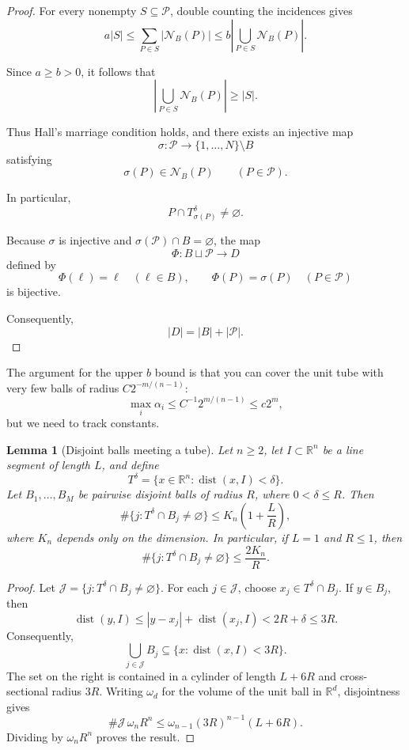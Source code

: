\documentclass[11pt, letterpaper]{nyjm}
\newtheorem{lemma}[theorem]{Lemma}
\begin{document}
	\begin{proof}
		For every nonempty $S\subseteq\mathcal P$,
		double counting the incidences gives
		\[
		a|S|
		\le \sum_{P\in S}|\mathcal N_B(P)|
		\le b\left|
		\bigcup_{P\in S}\mathcal N_B(P)
		\right|.
		\]
		
		Since $a\ge b>0$, it follows that
		\[
		\left|
		\bigcup_{P\in S}\mathcal N_B(P)
		\right|
		\ge |S|.
		\]
		
		Thus Hall's marriage condition holds, and
		there exists an injective map
		\[
		\sigma:\mathcal P
		\longrightarrow\{1,\ldots,N\}\setminus B
		\]
		satisfying
		\[
		\sigma(P)\in\mathcal N_B(P)
		\qquad(P\in\mathcal P).
		\]
		
		In particular,
		\[
		P\cap T_{\sigma(P)}^\delta\ne\varnothing.
		\]
		
		Because $\sigma$ is injective and
		$\sigma(\mathcal P)\cap B=\varnothing$,
		the map
		\[
		\Phi:B\sqcup\mathcal P\longrightarrow D
		\]
		defined by
		\[
		\Phi(\ell)=\ell\quad(\ell\in B),
		\qquad
		\Phi(P)=\sigma(P)\quad(P\in\mathcal P)
		\]
		is bijective.
		
		Consequently,
		\[
		|D|=|B|+|\mathcal P|.
		\]
	\end{proof}
	
	
	The argument for the upper $b$ bound is that you can cover the unit tube with very few balls of radius $C2^{-m/(n-1)}$: 
	\[
	\max_i \alpha_i \leq C^{-1}2^{m/(n-1)} \leq c2^{m},
	\]
	but we need to track constants.
	\begin{lemma}[Disjoint balls meeting a tube]
		Let $n\ge2$, let $I\subset\mathbb{R}^n$ be a line segment
		of length $L$, and define
		\[
		T^\delta=\{x\in\mathbb{R}^n:\operatorname{dist}(x,I)<\delta\}.
		\]
		Let $B_1,\ldots,B_M$ be pairwise disjoint balls of radius $R$,
		where $0<\delta\le R$. Then
		\[
		\#\{j:T^\delta\cap B_j\ne\varnothing\}
		\le K_n\left(1+\frac{L}{R}\right),
		\]
		where $K_n$ depends only on the dimension.
		In particular, if $L=1$ and $R\le1$, then
		\[
		\#\{j:T^\delta\cap B_j\ne\varnothing\}\le \frac{2K_n}{R}.
		\]
	\end{lemma}
	
	\begin{proof}
		Let $\mathcal{J}=\{j:T^\delta\cap B_j\ne\varnothing\}$.
		For each $j\in\mathcal{J}$, choose $x_j\in T^\delta\cap B_j$.
		If $y\in B_j$, then
		\[
		\operatorname{dist}(y,I)
		\le |y-x_j|+\operatorname{dist}(x_j,I)
		<2R+\delta\le3R.
		\]
		Consequently,
		\[
		\bigcup_{j\in\mathcal{J}}B_j
		\subseteq\{x:\operatorname{dist}(x,I)<3R\}.
		\]
		The set on the right is contained in a cylinder of length
		$L+6R$ and cross-sectional radius $3R$.
		Writing $\omega_d$ for the volume of the unit ball in
		$\mathbb{R}^d$, disjointness gives
		\[
		\#\mathcal{J}\,\omega_n R^n
		\le \omega_{n-1}(3R)^{n-1}(L+6R).
		\]
		Dividing by $\omega_n R^n$ proves the result.
	\end{proof}
	
\end{document}
